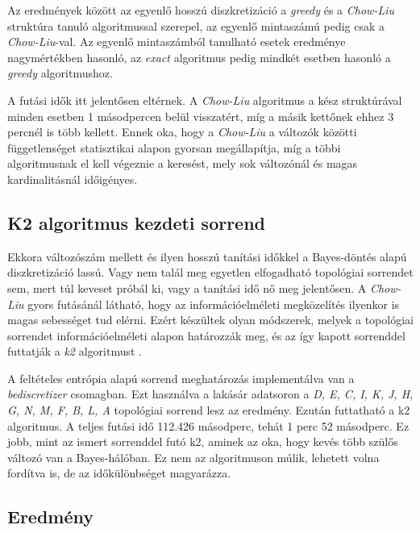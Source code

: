 Az eredmények között az egyenlő hosszú diszkretizáció a \emph{greedy} és a \emph{Chow-Liu} struktúra tanuló algoritmussal szerepel, az egyenlő mintaszámú pedig csak a \emph{Chow-Liu}-val. Az egyenlő mintaszámból tanulható esetek eredménye nagymértékben hasonló, az \emph{exact} algoritmus pedig mindkét esetben hasonló a \emph{greedy} algoritmushoz.

A futási idők itt jelentősen eltérnek. A \emph{Chow-Liu} algoritmus a kész struktúrával minden esetben 1 másodpercen belül visszatért, míg a másik kettőnek ehhez 3 percnél is több kellett. Ennek oka, hogy a \emph{Chow-Liu} a változók közötti függetlenséget statisztikai alapon gyorsan megállapítja, míg a többi algoritmusnak el kell végeznie a keresést, mely sok változónál és magas kardinalitásnál időigényes.

\subsection{K2 algoritmus kezdeti sorrend}
Ekkora változószám mellett és ilyen hosszú tanítási időkkel a Bayes-döntés alapú diszkretizáció lassú. Vagy nem talál meg egyetlen elfogadható topológiai sorrendet sem, mert túl keveset próbál ki, vagy a tanítási idő nő meg jelentősen. A \emph{Chow-Liu} gyors futásánál látható, hogy az információelméleti megközelítés ilyenkor is magas sebességet tud elérni. Ezért készültek olyan módszerek, melyek a topológiai sorrendet információelméleti alapon határozzák meg, és az így kapott sorrenddel futtatják a \emph{k2} algoritmust \cite{aghdam2019some}.

A feltételes entrópia alapú sorrend meghatározás implementálva van a \emph{bediscretizer} csomagban. Ezt használva a lakásár adatsoron a \emph{D, E, C, I, K, J, H, G, N, M, F, B, L, A} topológiai sorrend lesz az eredmény. Ezután futtatható a k2 algoritmus. A teljes futási idő 112.426 másodperc, tehát 1 perc 52 másodperc. Ez jobb, mint az ismert sorrenddel futó k2, aminek az oka, hogy kevés több szülős változó van a Bayes-hálóban. Ez nem az algoritmuson múlik, lehetett volna fordítva is, de az időkülönbséget magyarázza.

\subsection{Eredmény}

